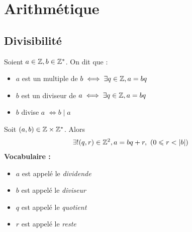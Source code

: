 \chapter{Arithmétique}
\section{Divisibilité}
\begin{graybox}
\begin{definition}
Soient $a \in \mathbb{Z}, b \in \mathbb{Z}^*$. 
On dit que :
\begin{itemize}
\item $a$ est un multiple de $b \iff \exists q \in \mathbb{Z}, a = bq$
\item $b$ est un diviseur de $a \iff \exists q \in \mathbb{Z}, a = bq$
\item $b$ divise $a$ $\iff b \mid a$
\end{itemize}
\end{definition}
\end{graybox}

\begin{graybox}
\begin{theoreme}
Soit $(a, b) \in \mathbb{Z} \times \mathbb{Z}^*$. Alors
\begin{align*}
\exists ! (q, r) \in \mathbb{Z}^2, a = bq + r,\ (0 \leqslant r < |b|)
\end{align*}
\textbf{Vocabulaire :}
\begin{itemize}
\item $a$ est appelé le \textit{dividende}
\item $b$ est appelé le \textit{diviseur}
\item $q$ est appelé le \textit{quotient}
\item $r$ est appelé le \textit{reste}
\end{itemize}
\end{theoreme}
\end{graybox}

